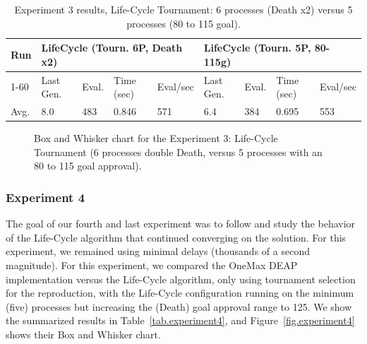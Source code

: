\documentclass[graybox]{svmult}
\begin{document}
\begin{table}[]
    \centering        
    \caption{Experiment 3 results, Life-Cycle Tournament: 6 processes (Death x2) versus 5 processes (80 to 115 goal).}\label{tab.experiment3}
    \begin{tabular}{|l|l|l|l|l|l|l|l|l|}
    \hline
    Run & \multicolumn{4}{l|}{LifeCycle (Tourn. 6P, Death x2)} & \multicolumn{4}{l|}{LifeCycle (Tourn. 5P, 80-115g)} \\ \hline
    1-60 & Last Gen. & Eval. & Time (sec) & Eval/sec & Last Gen. & Eval. & Time (sec) & Eval/sec \\ \hline
    Avg. & 8.0 & 483 & 0.846 & 571 & 6.4 & 384 & 0.695 & 553 \\ \hline
    \end{tabular}
    \end{table}

\begin{figure}
    \caption{Box and Whisker chart for the Experiment 3: Life-Cycle Tournament (6 processes double Death, versus 5 processes with an 80 to 115 goal approval).} \label{fig.experiment3}
    \end{figure}


\subsubsection{Experiment 4} The goal of our fourth and last experiment was to
follow and study the behavior of the Life-Cycle algorithm that continued
converging on the solution. For this experiment, we remained using minimal
delays (thousands of a second magnitude). For this experiment, we compared the
OneMax DEAP implementation versus the Life-Cycle algorithm, only using
tournament selection for the reproduction, with the Life-Cycle configuration
running on the minimum (five) processes but increasing the (Death) goal
approval range to 125. We show the summarized results in
Table~\ref{tab.experiment4}, and Figure~\ref{fig.experiment4} shows their Box
and Whisker chart.
\end{document}
